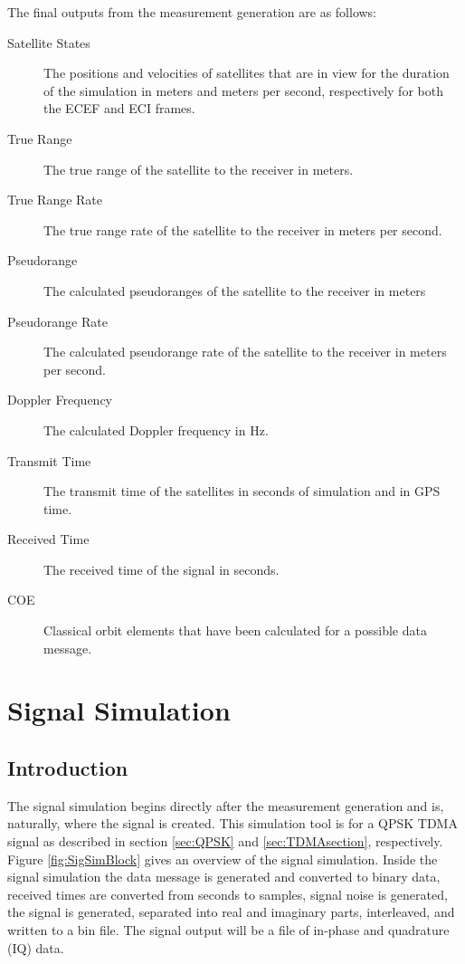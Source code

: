 \documentclass[12pt]{report}
\begin{document}
The final outputs from the measurement generation are as follows:
\begin{description}
    \item[Satellite States] The positions and velocities of satellites that are in view for the duration of the simulation in meters and meters per second, respectively for both the ECEF and ECI frames. 
    \item[True Range] The true range of the satellite to the receiver in meters.
    \item[True Range Rate] The true range rate of the satellite to the receiver in meters per second.
    \item[Pseudorange] The calculated pseudoranges of the satellite to the receiver in meters
    \item[Pseudorange Rate] The calculated pseudorange rate of the satellite to the receiver in meters per second.
    \item[Doppler Frequency] The calculated Doppler frequency in Hz.
    \item[Transmit Time] The transmit time of the satellites in seconds of simulation and in GPS time.
    \item[Received Time] The received time of the signal in seconds.
    \item[COE] Classical orbit elements that have been calculated for a possible data message.    
\end{description}

\section{Signal Simulation}
\subsection{Introduction}
The signal simulation begins directly after the measurement generation and is, naturally, where the signal is created. This simulation tool is for a QPSK TDMA signal as described in section \ref{sec:QPSK} and \ref{sec:TDMAsection}, respectively. Figure \ref{fig:SigSimBlock} gives an overview of the signal simulation. Inside the signal simulation the data message is generated and converted to binary data, received times are converted from seconds to samples, signal noise is generated, the signal is generated, separated into real and imaginary parts, interleaved, and written to a bin file. The signal output will be a file of in-phase and quadrature (IQ) data.
\end{document}
